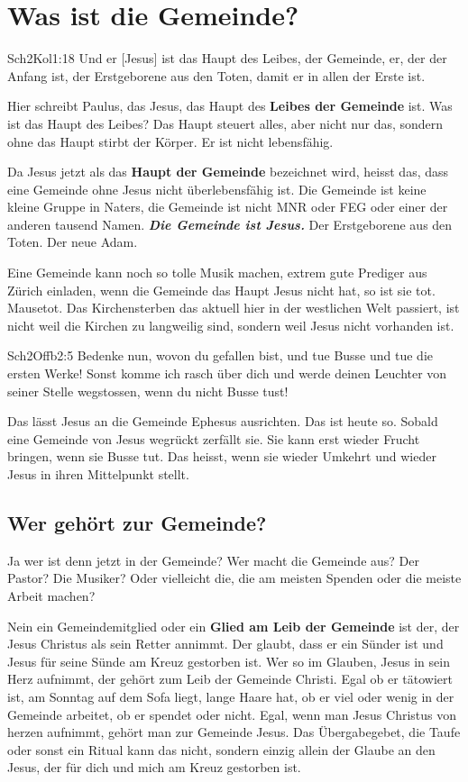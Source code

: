 
\section{Was ist die Gemeinde?}
\begin{bibeltext}{Sch2}{Kol}{1:18}
    Und er [Jesus] ist das Haupt des Leibes, der Gemeinde, er, der der Anfang ist, der
Erstgeborene aus den Toten, damit er in allen der Erste ist.
\end{bibeltext}
Hier schreibt Paulus, das Jesus, das Haupt des \textbf{Leibes der Gemeinde} ist. Was ist das Haupt des
Leibes? Das Haupt steuert alles, aber nicht nur das, sondern ohne das Haupt stirbt der Körper.
Er ist nicht lebensfähig.

Da Jesus jetzt als das \textbf{Haupt der Gemeinde} bezeichnet wird, heisst das, dass eine Gemeinde
ohne Jesus nicht überlebensfähig ist. Die Gemeinde ist keine kleine Gruppe in Naters, die Gemeinde
ist nicht MNR oder FEG oder einer der anderen tausend Namen. \textbf{\textit{Die Gemeinde ist Jesus.}} Der Erstgeborene aus den Toten. Der neue Adam.

Eine Gemeinde kann noch so tolle Musik machen, extrem gute Prediger aus Zürich einladen,
wenn die Gemeinde das Haupt Jesus nicht hat, so ist sie tot. Mausetot. Das Kirchensterben das
aktuell hier in der westlichen Welt passiert, ist nicht weil die Kirchen zu langweilig sind, sondern
weil Jesus nicht vorhanden ist.
\begin{bibeltext}{Sch2}{Offb}{2:5}
Bedenke nun, wovon du gefallen bist, und tue Busse und tue die ersten Werke! Sonst
komme ich rasch über dich und werde deinen Leuchter von seiner Stelle wegstossen,
wenn du nicht Busse tust!
\end{bibeltext}
Das lässt Jesus an die Gemeinde Ephesus ausrichten. Das ist heute so. Sobald eine Gemeinde von
Jesus wegrückt zerfällt sie. Sie kann erst wieder Frucht bringen, wenn sie Busse tut. Das heisst,
wenn sie wieder Umkehrt und wieder Jesus in ihren Mittelpunkt stellt.
\subsection{Wer gehört zur Gemeinde?}
Ja wer ist denn jetzt in der Gemeinde? Wer macht die Gemeinde aus? Der Pastor? Die Musiker?
Oder vielleicht die, die am meisten Spenden oder die meiste Arbeit machen?

Nein ein Gemeindemitglied oder ein \textbf{Glied am Leib der Gemeinde} ist der, der Jesus Christus
als sein Retter annimmt. Der glaubt, dass er ein Sünder ist und Jesus für seine Sünde am Kreuz
gestorben ist. Wer so im Glauben, Jesus in sein Herz aufnimmt, der gehört zum Leib der Gemeinde
Christi. Egal ob er tätowiert ist, am Sonntag auf dem Sofa liegt, lange Haare hat, ob er viel oder
wenig in der Gemeinde arbeitet, ob er spendet oder nicht. Egal, wenn man Jesus Christus von
herzen aufnimmt, gehört man zur Gemeinde Jesus. Das Übergabegebet, die Taufe oder sonst ein
Ritual kann das nicht, sondern einzig allein der Glaube an den Jesus, der für dich und mich am
Kreuz gestorben ist.

